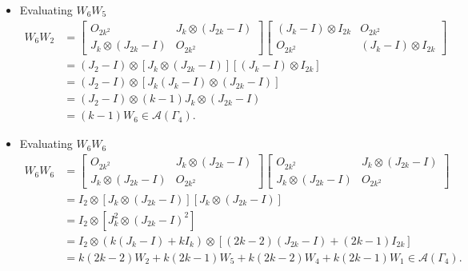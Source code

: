 \begin{itemize}
    \item Evaluating \( W_6 W_5 \)
    \begin{align*}
        W_6W_2
        &=\begin{bmatrix}
            O_{2k^2} & J_k \otimes (J_{2k}-I) \\
            J_k \otimes (J_{2k}-I) & O_{2k^2}
        \end{bmatrix}\begin{bmatrix}
            (J_k -I) \otimes I_{2k} & O_{2k^2}\\
            O_{2k^2} & (J_k -I) \otimes I_{2k}
        \end{bmatrix}\\
        &= (J_2-I)\otimes [J_k \otimes (J_{2k}-I)][(J_k -I) \otimes I_{2k}]\\
        &= (J_2-I)\otimes [J_k(J_k-I) \otimes (J_{2k}-I)]\\
        &= (J_2-I)\otimes (k-1)J_k\otimes (J_{2k}-I)\\
        &= (k-1)W_6\in\mathcal{A}(\Gamma_4).
    \end{align*}
    
    \item Evaluating \( W_6 W_6 \)
    \begin{align*}
        W_6W_6
        &=\begin{bmatrix}
            O_{2k^2} & J_k \otimes (J_{2k}-I) \\
            J_k \otimes (J_{2k}-I) & O_{2k^2}
        \end{bmatrix}\begin{bmatrix}
            O_{2k^2} & J_k \otimes (J_{2k}-I) \\
            J_k \otimes (J_{2k}-I) & O_{2k^2}
        \end{bmatrix}\\
        &= I_2\otimes [J_k \otimes (J_{2k}-I)][J_k \otimes (J_{2k}-I)]\\
        &= I_2\otimes [J_k^2\otimes(J_{2k}-I)^2]\\
        &= I_2\otimes (k(J_k-I) + kI_k)\otimes [(2k-2)(J_{2k}-I) + (2k-1)I_{2k}]\\
        &= k(2k-2)W_2 +k(2k-1)W_5 + k(2k-2)W_4 + k(2k-1)W_1\in\mathcal{A}(\Gamma_4).
    \end{align*}
\end{itemize}


